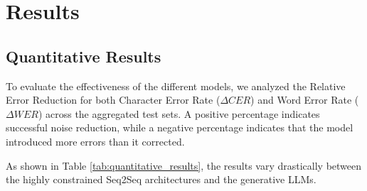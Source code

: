 \documentclass[11pt]{extarticle}
\begin{document}



\section{Results}

\subsection{Quantitative Results}
To evaluate the effectiveness of the different models, we analyzed the Relative Error Reduction for both Character Error Rate ($\Delta CER$) and Word Error Rate ($\Delta WER$) across the aggregated test sets. A positive percentage indicates successful noise reduction, while a negative percentage indicates that the model introduced more errors than it corrected.

As shown in Table \ref{tab:quantitative_results}, the results vary drastically between the highly constrained Seq2Seq architectures and the generative LLMs.
\end{document}
